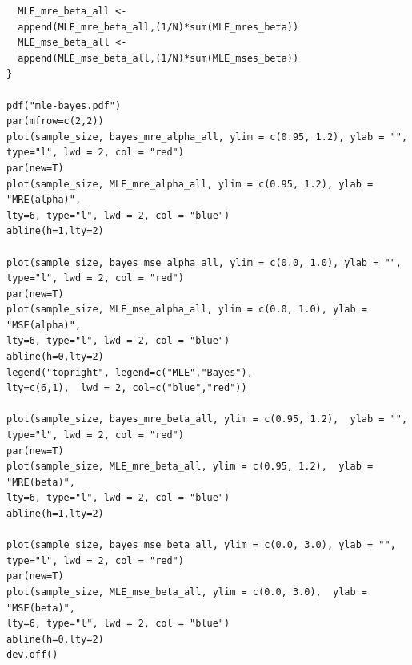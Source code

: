 \documentclass[titlepage,twoside]{jarticle}
\theoremstyle{definition}
\begin{document}
\begin{verbatim}
  MLE_mre_beta_all <- 
  append(MLE_mre_beta_all,(1/N)*sum(MLE_mres_beta))
  MLE_mse_beta_all <- 
  append(MLE_mse_beta_all,(1/N)*sum(MLE_mses_beta))
}

pdf("mle-bayes.pdf")
par(mfrow=c(2,2))
plot(sample_size, bayes_mre_alpha_all, ylim = c(0.95, 1.2), ylab = "", 
type="l", lwd = 2, col = "red")
par(new=T)
plot(sample_size, MLE_mre_alpha_all, ylim = c(0.95, 1.2), ylab = "MRE(alpha)",
lty=6, type="l", lwd = 2, col = "blue")
abline(h=1,lty=2)

plot(sample_size, bayes_mse_alpha_all, ylim = c(0.0, 1.0), ylab = "", 
type="l", lwd = 2, col = "red")
par(new=T)
plot(sample_size, MLE_mse_alpha_all, ylim = c(0.0, 1.0), ylab = "MSE(alpha)", 
lty=6, type="l", lwd = 2, col = "blue")
abline(h=0,lty=2)
legend("topright", legend=c("MLE","Bayes"), 
lty=c(6,1),  lwd = 2, col=c("blue","red"))

plot(sample_size, bayes_mre_beta_all, ylim = c(0.95, 1.2),  ylab = "", 
type="l", lwd = 2, col = "red") 
par(new=T)
plot(sample_size, MLE_mre_beta_all, ylim = c(0.95, 1.2),  ylab = "MRE(beta)", 
lty=6, type="l", lwd = 2, col = "blue")
abline(h=1,lty=2)

plot(sample_size, bayes_mse_beta_all, ylim = c(0.0, 3.0), ylab = "", 
type="l", lwd = 2, col = "red")
par(new=T)
plot(sample_size, MLE_mse_beta_all, ylim = c(0.0, 3.0),  ylab = "MSE(beta)", 
lty=6, type="l", lwd = 2, col = "blue")
abline(h=0,lty=2)
dev.off()
\end{verbatim}




\end{document}
